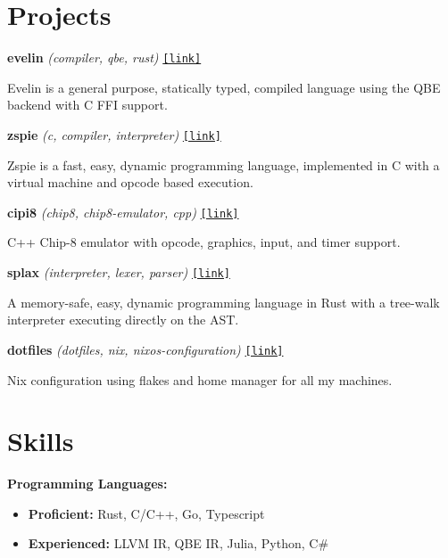 \documentclass[a4paper,11pt]{article}
\begin{document}
\section*{Projects}
\noindent\textbf{evelin} \textit{\footnotesize (compiler, qbe, rust) } \hfill \texttt{\href{https://github.com/prashantrahul141/evelin}{[link]}} \\ 
\parbox{0.88\textwidth}{Evelin is a general purpose, statically typed, compiled language using the QBE backend with C FFI support.}  \vspace{0.8em} 

\noindent\textbf{zspie} \textit{\footnotesize (c, compiler, interpreter) } \hfill \texttt{\href{https://github.com/prashantrahul141/zspie}{[link]}} \\ 
\parbox{0.88\textwidth}{Zspie is a fast, easy, dynamic programming language, implemented in C with a virtual machine and opcode based execution.}  \vspace{0.8em} 

\noindent\textbf{cipi8} \textit{\footnotesize (chip8, chip8-emulator, cpp) } \hfill \texttt{\href{https://github.com/prashantrahul141/cipi8}{[link]}} \\ 
\parbox{0.88\textwidth}{C++ Chip-8 emulator with opcode, graphics, input, and timer support.}  \vspace{0.8em} 

\noindent\textbf{splax} \textit{\footnotesize (interpreter, lexer, parser) } \hfill \texttt{\href{https://github.com/prashantrahul141/splax}{[link]}} \\ 
\parbox{0.88\textwidth}{A memory-safe, easy, dynamic programming language in Rust with a tree-walk interpreter executing directly on the AST.}  \vspace{0.8em} 

\noindent\textbf{dotfiles} \textit{\footnotesize (dotfiles, nix, nixos-configuration) } \hfill \texttt{\href{https://github.com/prashantrahul141/dotfiles}{[link]}} \\ 
\parbox{0.88\textwidth}{Nix configuration using flakes and home manager for all my machines.}  \vspace{0.8em} 
\vspace{-0.5em}\section*{Skills}
\textbf{Programming Languages:}
\begin{itemize}[noitemsep, topsep=0pt]
    \item \textbf{Proficient:} Rust, C/C++, Go, Typescript
    \item \textbf{Experienced:} LLVM IR, QBE IR, Julia, Python, C\# \vspace{0.5em}
\end{itemize}
\end{document}
